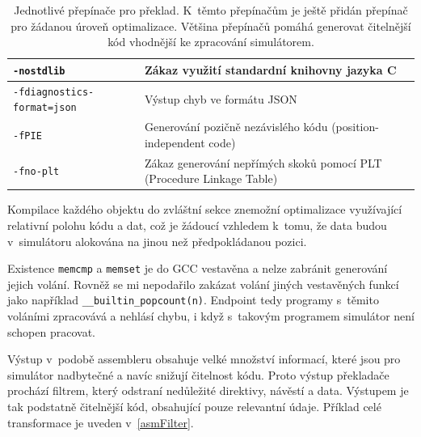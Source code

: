 \begin{table}[]
\begin{tabular}{|l|p{8cm}|}
\texttt{-nostdlib}                       & Zákaz využití standardní knihovny jazyka C                            \\ \hline
\texttt{-fdiagnostics-format=json}       & Výstup chyb ve formátu JSON                                           \\ \hline
\texttt{-fPIE}                           & Generování pozičně nezávislého kódu (position-independent code)       \\ \hline
\texttt{-fno-plt}                        & Zákaz generování nepřímých skoků pomocí PLT (Procedure Linkage Table) \\ \hline
\end{tabular}
\caption{Jednotlivé přepínače pro překlad. K~těmto přepínačům je ještě přidán přepínač pro žádanou úroveň optimalizace. Většina přepínačů pomáhá generovat čitelnější kód vhodnější ke zpracování simulátorem.}
\label{gccFlags}
\end{table}

Kompilace každého objektu do zvláštní sekce znemožní optimalizace využívající relativní polohu kódu a dat, což je žádoucí vzhledem k~tomu, že data budou v~simulátoru alokována na jinou než předpokládanou pozici.

Existence \texttt{memcmp} a \texttt{memset} je do GCC vestavěna a nelze zabránit generování jejich volání.
Rovněž se mi nepodařilo zakázat volání jiných vestavěných funkcí jako například \texttt{\_\_builtin\_popcount(n)}.
Endpoint tedy programy s~těmito voláními zpracovává a nehlásí chybu, i když s~takovým programem simulátor není schopen pracovat.

Výstup v~podobě assembleru obsahuje velké množství informací, které jsou pro simulátor nadbytečné a navíc snižují čitelnost kódu.
Proto výstup překladače prochází filtrem, který odstraní nedůležité direktivy, návěstí a data.
Výstupem je tak podstatně čitelnější kód, obsahující pouze relevantní údaje.
Příklad celé transformace je uveden v~\ref{asmFilter}.


